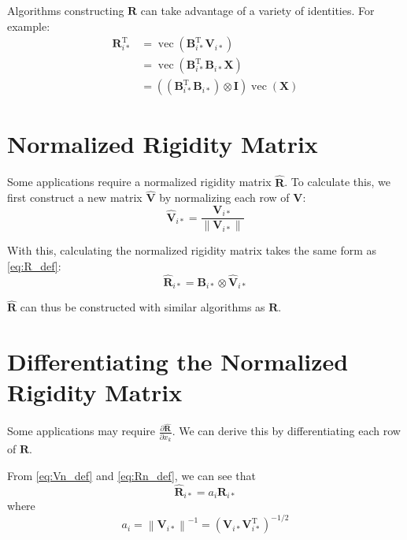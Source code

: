 \documentclass[11pt]{article}
\DeclareMathOperator\vectorize{vec}
\begin{document}
Algorithms constructing $\mathbf{R}$ can take advantage of a variety of
identities. For example:
\begin{align}
    \mathbf{R}_{i*}^\mathrm{T}
    &= \vectorize(\mathbf{B}_{i*}^\mathrm{T} \mathbf{V}_{i*}) \\
    &= \vectorize(\mathbf{B}_{i*}^\mathrm{T} \mathbf{B}_{i*} \mathbf{X}) \\
    &= ((\mathbf{B}_{i*}^\mathrm{T} \mathbf{B}_{i*}) \otimes \mathbf{I})
    \vectorize(\mathbf{X}) \label{eq:R_expanded}
\end{align}

\section{Normalized Rigidity Matrix}

Some applications require a normalized rigidity matrix $\mathbf{\hat{R}}$.
To calculate this, we first construct a new matrix $\mathbf{\hat{V}}$ by
normalizing each row of $\mathbf{V}$:
\begin{equation} \label{eq:Vn_def}
    \mathbf{\hat{V}}_{i*}
    = \frac{\mathbf{V}_{i*}}{\left \lVert \mathbf{V}_{i*} \right \rVert}
\end{equation}

With this, calculating the normalized rigidity matrix takes the same form as \eqref{eq:R_def}:
\begin{equation} \label{eq:Rn_def}
    \mathbf{\hat{R}}_{i*} = \mathbf{B}_{i*} \otimes \mathbf{\hat{V}}_{i*}
\end{equation}

$\mathbf{\hat{R}}$ can thus be constructed with similar algorithms as $\mathbf{R}$.

\section{Differentiating the Normalized Rigidity Matrix}

Some applications may require $\frac{\partial \mathbf{\hat{R}}}{\partial x_k}$.
We can derive this by differentiating each row of $\mathbf{\hat{R}}$.

From \eqref{eq:Vn_def} and \eqref{eq:Rn_def}, we can see that
\begin{equation}
    \mathbf{\hat{R}}_{i*} = a_i \mathbf{R}_{i*}
\end{equation}
where
\begin{equation} \label{eq:a_def}
    a_i = \left \lVert \mathbf{V}_{i*} \right \rVert^{-1}
    = (\mathbf{V}_{i*} \mathbf{V}_{i*}^\mathrm{T})^{-1/2}
\end{equation}
\end{document}
